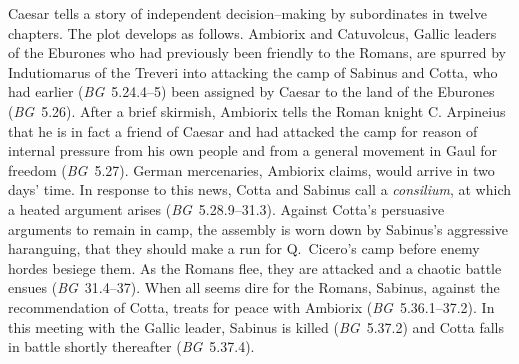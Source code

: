 \documentclass[12pt,letterpaper,oneside,final]{memoir}
\begin{document}
Caesar tells a story of independent decision--making by subordinates in twelve chapters. The plot develops as follows. Ambiorix and Catuvolcus, Gallic leaders of the Eburones who had previously been friendly to the Romans, are spurred by Indutiomarus of the Treveri into attacking the camp of Sabinus and Cotta, who had earlier  (\emph{BG}~5.24.4--5) been assigned by Caesar to the land of the Eburones (\emph{BG}~5.26). After a brief skirmish, Ambiorix tells the Roman knight C. Arpineius that he is in fact a friend of Caesar and had attacked the camp for reason of internal pressure from his own people and from a general movement in Gaul for freedom (\emph{BG}~5.27). German mercenaries, Ambiorix claims, would arrive in two days' time. In response to this news, Cotta and Sabinus call a \emph{consilium}, at which a heated argument arises (\emph{BG}~5.28.9--31.3). Against Cotta's persuasive arguments to remain in camp, the assembly is worn down by Sabinus's aggressive haranguing, that they should make a run for Q.~Cicero's camp before enemy hordes besiege them. As the Romans flee, they are attacked and a chaotic battle ensues (\emph{BG}~31.4--37). When all seems dire for the Romans, Sabinus, against the recommendation of Cotta, treats for peace with Ambiorix (\emph{BG}~5.36.1--37.2). In this meeting with the Gallic leader, Sabinus is killed (\emph{BG}~5.37.2) and Cotta falls in battle shortly thereafter (\emph{BG}~5.37.4).
\end{document}
